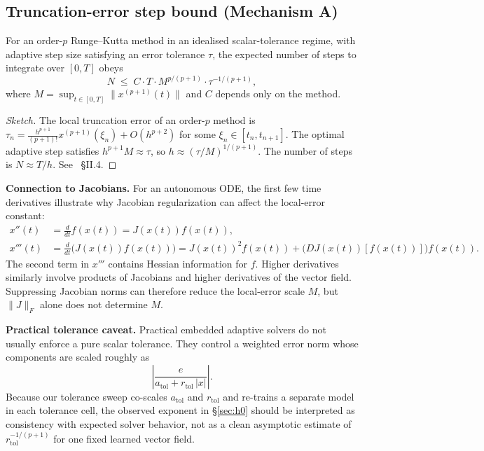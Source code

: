 \subsection{Truncation-error step bound (Mechanism A)}
\label{app:trunc-bound}

\begin{theorem}
\label{thm:accuracy}
For an order-$p$ Runge--Kutta method in an idealised scalar-tolerance regime,
with adaptive step size satisfying an error tolerance $\tau$, the expected
number of steps to integrate over $[0, T]$ obeys
\begin{equation}
N \;\leq\; C \cdot T \cdot M^{p/(p+1)} \cdot \tau^{-1/(p+1)},
\label{eq:accuracy-bound}
\end{equation}
where $M = \sup_{t \in [0,T]} \|x^{(p+1)}(t)\|$ and $C$ depends only on the method.
\end{theorem}

\begin{proof}[Sketch]
The local truncation error of an order-$p$ method is
$\tau_n = \frac{h^{p+1}}{(p+1)!} x^{(p+1)}(\xi_n) + O(h^{p+2})$ for some
$\xi_n \in [t_n, t_{n+1}]$. The optimal adaptive step satisfies
$h^{p+1} M \approx \tau$, so $h \approx (\tau / M)^{1/(p+1)}$. The number of steps is
$N \approx T / h$. See~\cite{hairer1993solving} \S II.4.
\end{proof}

\textbf{Connection to Jacobians.} For an autonomous ODE, the first few time
derivatives illustrate why Jacobian regularization can affect the local-error
constant:
\begin{align}
x''(t)
  &= \frac{d}{dt} f(x(t))
   = J(x(t)) f(x(t)), \\
x'''(t)
  &= \frac{d}{dt}\bigl(J(x(t)) f(x(t))\bigr)
   = J(x(t))^2 f(x(t)) + \bigl(DJ(x(t))[f(x(t))]\bigr) f(x(t)).
\end{align}
The second term in $x'''$ contains Hessian information for $f$. Higher
derivatives similarly involve products of Jacobians and higher derivatives of
the vector field. Suppressing Jacobian norms can therefore reduce the
local-error scale $M$, but $\|J\|_F$ alone does not determine $M$.

\textbf{Practical tolerance caveat.} Practical embedded adaptive solvers do not
usually enforce a pure scalar tolerance. They control a weighted error norm
whose components are scaled roughly as
\begin{equation}
\left|
\frac{e}{a_\text{tol} + r_\text{tol}\,|x|}
\right|.
\label{eq:weighted-error-norm}
\end{equation}
Because our tolerance sweep co-scales $a_\text{tol}$ and $r_\text{tol}$ and
re-trains a separate model in each tolerance cell, the observed exponent in
\S\ref{sec:h0} should be interpreted as consistency with expected solver
behavior, not as a clean asymptotic estimate of $r_\text{tol}^{-1/(p+1)}$ for
one fixed learned vector field.

